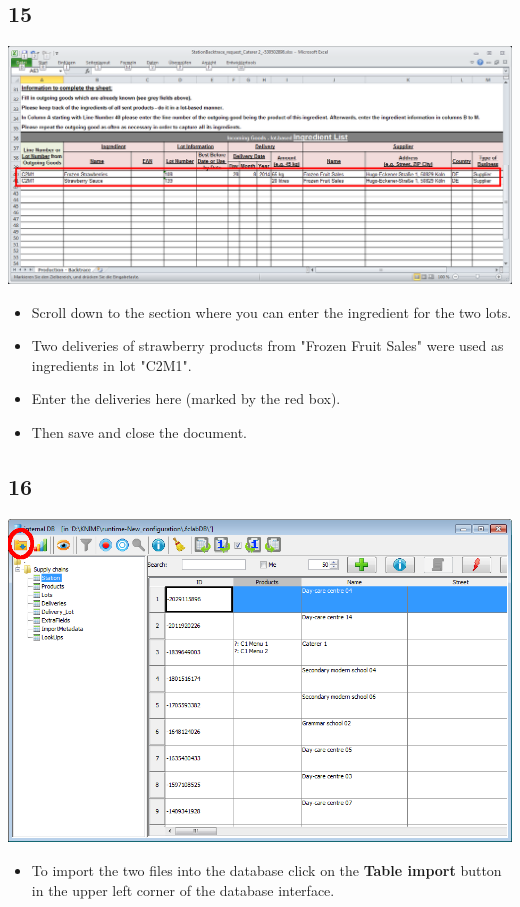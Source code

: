 \documentclass{beamer}
\begin{document}
\subsection{15}
\begin{frame}
	\begin{center}
 		\includegraphics[height=0.5\textheight]{15.png}
	\end{center}
	\begin{itemize}
		\item Scroll down to the section where you can enter the ingredient for the two lots.
		\item Two deliveries of strawberry products from "Frozen Fruit Sales" were used as ingredients in lot "C2M1".
		\item Enter the deliveries here (marked by the red box).
		\item Then save and close the document.
	\end{itemize}
\end{frame}

\subsection{16}
\begin{frame}
	\begin{center}
  		\includegraphics[height=0.6\textheight]{16.png}
	\end{center}
	\begin{itemize}
		\item To import the two files into the database click on the \textbf{Table import} button in the upper left corner of the database interface.
	\end{itemize}
\end{frame}
\end{document}

